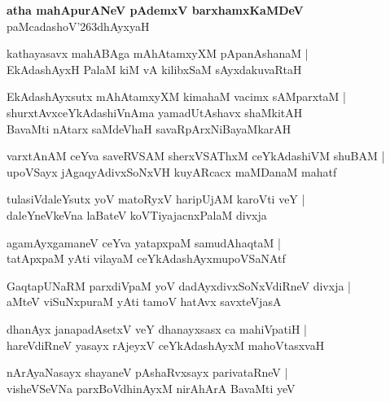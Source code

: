 \begin{center}
\textbf{\large atha mahApurANeV pAdemxV barxhamxKaMDeV}\\
paMcadashoV\char'263dhAyxyaH
\end{center}

\setcounter{shloka}{0}
\begin{shloka}
kathayasavx mahABAga mAhAtamxyXM pApanAshanaM |\\
EkAdashAyxH PalaM kiM vA kilibxSaM sAyxdakuvaRtaH 
\end{shloka}

\begin{shloka}
EkAdashAyxsutx mAhAtamxyXM kimahaM vacimx sAMparxtaM |\\
shurxtAvxceYkAdashiVnAma yamadUtAshavx shaMkitAH\\
BavaMti nAtarx saMdeVhaH savaRpArxNiBayaMkarAH
\end{shloka}

\begin{shloka}
varxtAnAM ceYva saveRVSAM sherxVSAThxM ceYkAdashiVM shuBAM |\\
upoVSayx jAgaqyAdivxSoNxVH kuyARcacx maMDanaM mahatf
\end{shloka}

\begin{shloka}
tulasiVdaleYsutx yoV matoRyxV haripUjAM karoVti veY |\\
daleYneVkeVna laBateV koVTiyajacnxPalaM divxja
\end{shloka}

\begin{shloka}
agamAyxgamaneV ceYva yatapxpaM samudAhaqtaM |\\
tatApxpaM yAti vilayaM ceYkAdashAyxmupoVSaNAtf 
\end{shloka}

\begin{shloka}
GaqtapUNaRM parxdiVpaM yoV dadAyxdivxSoNxVdiRneV divxja |\\
aMteV viSuNxpuraM yAti tamoV hatAvx savxteVjasA
\end{shloka}

\begin{shloka}
dhanAyx janapadAsetxV veY dhanayxsasx ca mahiVpatiH |\\
hareVdiRneV yasayx rAjeyxV ceYkAdashAyxM mahoVtasxvaH
\end{shloka}

\begin{shloka}
nArAyaNasayx shayaneV pAshaRvxsayx parivataRneV |\\
visheVSeVNa parxBoVdhinAyxM nirAhArA BavaMti yeV 
\end{shloka}

